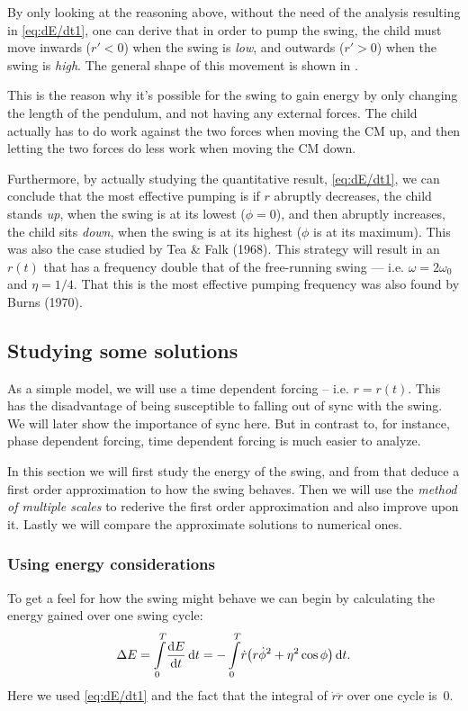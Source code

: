 By only looking at the reasoning above, without the need of the
analysis resulting in \eqref{eq:dE/dt1}, one can derive that in
order to pump the swing, the child must move inwards ($r'<0$) when the
swing is \emph{low}, and outwards ($r'>0$) when the swing is 
\emph{high}. The general shape of this movement is shown in
. 

This is the reason why it's possible for the swing to gain energy by
only changing the length of the pendulum, and not having any external
forces. The child actually has to do work against the two forces when
moving the CM up, and then letting  the two forces do less work
when moving the CM down.

Furthermore, by actually studying the quantitative result,
\eqref{eq:dE/dt1}, we can conclude that the most effective pumping
is if $r$ abruptly decreases, the child stands \emph{up}, when
the swing is at its lowest ($\phi=0$), and then abruptly increases,
the child sits \emph{down}, when the swing is at its highest ($\phi$
is at its maximum). This was also the case studied by Tea \&
Falk (1968). %
This strategy will result in an $r(t)$ that has a frequency 
double that of the free-running swing --- i.e. $\omega=2\omega_0$ and
$\eta=1/4$. That this is the most effective pumping frequency was also
found by Burns (1970). %




\subsection{Studying some solutions}
As a simple model, we will use a time dependent forcing --
i.e. $r=r(t)$. This has the disadvantage of being susceptible to
falling out of sync with the swing. We will later show the importance
of sync here. But in contrast to, for instance, phase dependent forcing,
time dependent forcing is much easier to analyze. 

In this section we will first study the energy of the swing, and from
that deduce a first order approximation to how the swing behaves. Then
we will use the \emph{method of multiple scales} to rederive the first
order approximation and also improve upon it. Lastly we will compare
the approximate solutions to numerical ones. 



\subsubsection{Using energy considerations}
\newcommand{\DE}{\Delta{E}}
To get a feel for how the swing might behave we can begin by
calculating the energy gained over one swing cycle:
\begin{equation}\label{eq:DE1}
\DE=\int_0^T\!\dv{E}{t}\id{t}
=-\int_0^T\! \dot{r}\qty(r\dot{\phi}^2 + \eta^2\cos\phi)\id{t}.
\end{equation}
Here we used \eqref{eq:dE/dt1} and the fact that the integral of
$\dot{r}\ddot{r}$ over one cycle is~$0$. 

